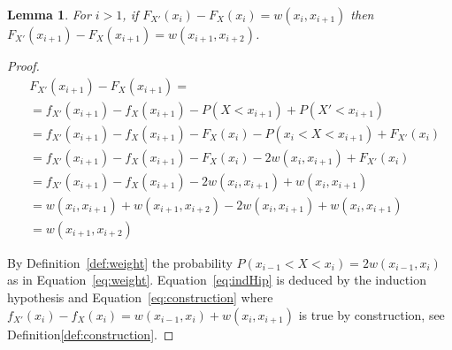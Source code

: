 \documentclass{article}
\newtheorem{lemma}[thm]{Lemma}
\begin{document}
\begin{lemma}
	For $i>1$, if $F_{X'}(x_{i})-F_{X}(x_{i}) = w(x_{i}, x_{i+1})$ then $F_{X'}(x_{i+1})-F_{X}(x_{i+1}) = w(x_{i+1}, x_{i+2})$.
\end{lemma}
\begin{proof}
	\begin{align}
	&F_{X'}(x_{i+1})-F_{X}(x_{i+1}) = \\ \nonumber
	& = f_{X'}(x_{i+1}) - f_{X}(x_{i+1}) - P(X<x_{i+1}) + P(X'<x_{i+1})  \\ \nonumber
	& = f_{X'}(x_{i+1}) - f_{X}(x_{i+1}) - F_X(x_{i}) - P(x_{i}< X < x_{i+1}) + F_{X'}(x_{i}) \\ 
	\label{eq:weight}
	& = f_{X'}(x_{i+1}) - f_{X}(x_{i+1}) - F_X(x_{i}) - 2w(x_{i},x_{i+1}) + F_{X'}(x_{i})  \\ \label{eq:indHip}
	& = f_{X'}(x_{i+1}) - f_{X}(x_{i+1}) - 2w(x_{i},x_{i+1}) +w(x_{i}, x_{i+1})  \\ \label{eq:construction}
	& = w(x_{i},x_{i+1}) +w(x_{i+1},x_{i+2}) - 2w(x_{i},x_{i+1}) +w(x_{i}, x_{i+1}) \\ \nonumber
	& = w(x_{i+1},x_{i+2}) \nonumber
	\end{align}
	
	By Definition~\ref{def:weight} the probability $P(x_{i-1}< X < x_i) = 2w(x_{i-1},x_{i})$ as in Equation~\eqref{eq:weight}. Equation~\eqref{eq:indHip} is deduced by the induction hypothesis and Equation~\eqref{eq:construction} where
	$f_{X'}(x_i) - f_{X}(x_i) = w(x_{i-1},x_i) + w(x_i,x_{i+1})$ is true by construction, see Definition\ref{def:construction}.
\end{proof}

\end{document}
